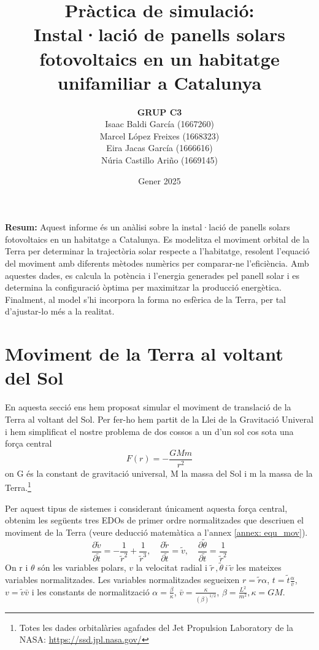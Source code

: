 \documentclass[11pt]{article}
\title{\Huge\bfseries Pràctica de simulació: \\ Instal·lació de panells solars fotovoltaics en un habitatge unifamiliar a Catalunya \\ [2ex] \Large}
\author{\begin{tabular}{c}
\textbf{GRUP C3} \\
Isaac Baldi García (1667260)\\
Marcel López Freixes (1668323) \\
Eira Jacas García (1666616) \\
Núria Castillo Ariño (1669145)
\end{tabular}}
\date{Gener 2025}
\begin{document}
\maketitle
\begin{center}
    \textbf{Resum:} Aquest informe és un anàlisi sobre la instal·lació de panells solars fotovoltaics en un habitatge a Catalunya. Es modelitza el moviment orbital de la Terra per determinar la trajectòria solar respecte a l’habitatge, resolent l’equació del moviment amb diferents mètodes numèrics per comparar-ne l’eficiència. Amb aquestes dades, es calcula la potència i l’energia generades pel panell solar i es determina la configuració òptima per maximitzar la producció energètica. Finalment, al model s'hi incorpora la forma no esfèrica de la Terra, per tal d'ajustar-lo més a la realitat.
\end{center}


\newpage

\tableofcontents
\newpage



\section{Moviment de la Terra al voltant del Sol} \label{sec: seccio_1}
En aquesta secció ens hem proposat simular el moviment de translació de la Terra al voltant del Sol. Per fer-ho hem partit de la Llei de la Gravitació Univeral i hem simplificat el nostre problema de dos cossos a un d'un sol cos sota una força central
\begin{equation}
    F(r)=-\frac{GMm}{r^2}
    \label{si}
\end{equation}
on G és la constant de gravitació universal, M la massa del Sol i m la massa de la Terra.\footnote{Totes les dades orbitalàries agafades del Jet Propulsion Laboratory de la NASA: \url{https://ssd.jpl.nasa.gov/}}

Per aquest tipus de sistemes i considerant únicament aquesta força central, obtenim les següents tres EDOs de primer ordre normalitzades que descriuen el moviment de la Terra (veure deducció matemàtica a l'annex \ref{annex: equ_mov}).
\begin{equation}
    \frac{\partial\tilde{v}}{\partial\tilde{t}}=-\frac{1}{\tilde{r}^2}+\frac{1}{\tilde{r}^3}, \quad
    \frac{\partial\tilde{r}}{\partial\tilde{t}}=\tilde{v}, \quad
    \frac{\partial\tilde{\theta}}{\partial\tilde{t}}=\frac{1}{\tilde{r}^2}
    \label{eq:all}
\end{equation}
On r i $\theta$ són les variables polars, $v$ la velocitat radial i $\tilde{r}\,, \tilde{\theta}\, i\, \tilde{v}$ les mateixes variables normalitzades. Les variables normalitzades segueixen $r=\tilde{r}\alpha$, $t=\tilde{t}\frac{\alpha}{\bar{v}}$, $v=\tilde{v}\bar{v}$ i les constants de normalització $\alpha = \frac{\beta}{\kappa}$, $\bar{v}=\frac{\kappa}{(\beta)^{1/2}}$, $\beta=\frac{L^2}{m^2}, \kappa=GM$. 
\end{document}
